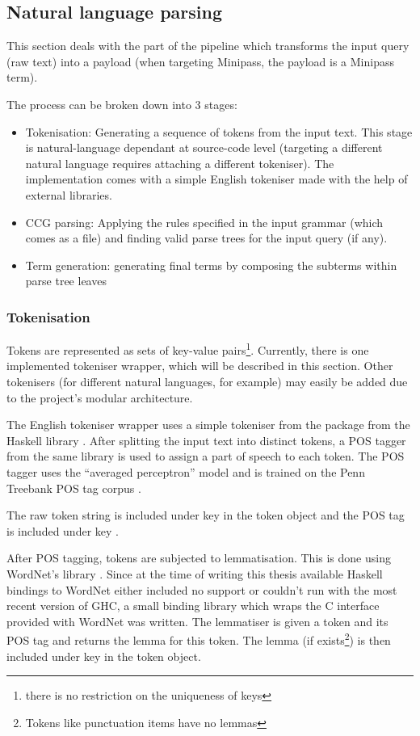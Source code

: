 \documentclass[main.tex]{subfiles}
\begin{document}
\subsection{Natural language parsing}
This section deals with the part of the pipeline which transforms the input
query (raw text) into a payload (when targeting Minipass, the payload is a
Minipass term).

The process can be broken down into 3 stages:
\begin{itemize}
    \item Tokenisation: Generating a sequence of tokens from the input text.
        This stage is natural-language dependant at source-code level (targeting
        a different natural language requires attaching a different tokeniser).
        The implementation comes with a simple English tokeniser made with the
        help of external libraries.
    \item CCG parsing: Applying the rules specified in the input grammar (which
        comes as a  file) and finding valid parse trees for the
        input query (if any).
    \item Term generation: generating final terms by composing the subterms
        within parse tree leaves
\end{itemize}

\subsubsection{Tokenisation}\label{sec:tokenisation}
Tokens are represented as sets of key-value pairs\footnote{there is no
    restriction on the uniqueness of keys}. Currently, there is one
implemented tokeniser wrapper, which will be described in this section. Other
tokenisers (for different natural languages, for example) may easily be added
due to the project's modular architecture.

The English tokeniser wrapper uses a simple tokeniser from the 
package from the  Haskell library \cite{chatter}.
After splitting the input text into distinct tokens, a POS tagger from the
same library is used to assign a part of speech to each token. The POS
tagger uses the ``averaged perceptron'' model \cite{collins} and is trained
on the Penn Treebank POS tag corpus \cite{penn}.

The raw token string is included under key  in the token object and
the POS tag is included under key .

After POS tagging, tokens are subjected to lemmatisation. This is done using
WordNet's  library \cite{wordnet}. Since at the time of writing
this thesis available Haskell bindings to WordNet either included no 
support or couldn't run with the most recent version of GHC, a small binding
library which wraps the C interface provided with WordNet was written. The
 lemmatiser is given a token and its POS tag and returns the lemma
for this token. The lemma (if exists\footnote{Tokens like punctuation items have
    no lemmas}) is then included under key  in the token object.
\end{document}
